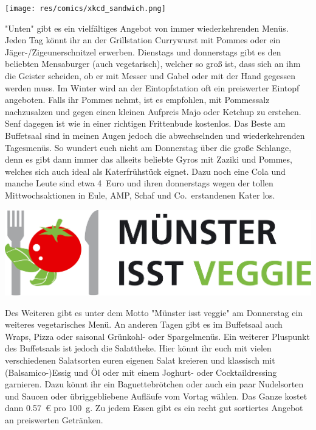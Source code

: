 \begin{multicols*}{2}
\begin{center}
	\texttt{[image: res/comics/xkcd\_sandwich.png]}
\end{center}
\vspace{-1em}
"Unten" gibt es ein vielfältiges Angebot von immer wiederkehrenden Menüs. Jeden Tag könnt ihr an der Grillstation Currywurst mit Pommes oder ein Jäger-/Zigeunerschnitzel erwerben. Dienstags und donnerstags gibt es den beliebten Mensaburger (auch vegetarisch), welcher so groß ist, dass sich an ihm die Geister scheiden, ob er mit Messer und Gabel oder mit der Hand gegessen werden muss. Im Winter wird an der Eintopfstation oft ein preiswerter Eintopf angeboten. Falls ihr Pommes nehmt, ist es empfohlen, mit Pommessalz nachzusalzen und gegen einen kleinen Aufpreis Majo oder Ketchup zu erstehen. Senf dagegen ist wie in einer richtigen Frittenbude kostenlos. Das Beste am Buffetsaal sind in meinen Augen jedoch die abwechselnden und wiederkehrenden Tagesmenüs. So wundert euch nicht am Donnerstag über die große Schlange, denn es gibt dann immer das allseits beliebte Gyros mit Zaziki und Pommes, welches sich auch ideal als Katerfrühstück eignet. Dazu noch eine Cola und manche Leute sind etwa 4~Euro und ihren donnerstags wegen der tollen Mittwochsaktionen in Eule, AMP, Schaf und Co.\ erstandenen Kater los.

\includegraphics[width=\columnwidth]{res/muenster_isst_veggie.png}

Des Weiteren gibt es unter dem Motto "Münster isst veggie" am Donnerstag ein weiteres vegetarisches Menü. An anderen Tagen gibt es im Buffetsaal auch Wraps, Pizza oder saisonal Grünkohl- oder Spargelmenüs. Ein weiterer Pluspunkt des Buffetsaals ist jedoch die Salattheke. Hier könnt ihr euch mit vielen verschiedenen Salatsorten euren eigenen Salat kreieren und klassisch mit (Balsamico-)Essig und Öl oder mit einem Joghurt- oder Cocktaildressing garnieren. Dazu könnt ihr ein Baguettebrötchen oder auch ein paar Nudelsorten und Saucen oder übriggebliebene Aufläufe vom Vortag wählen. Das Ganze kostet dann \SI{0,57}{\euro} pro \SI{100}{\g}. Zu jedem Essen gibt es ein recht gut sortiertes Angebot an preiswerten Getränken.


\end{multicols*}
